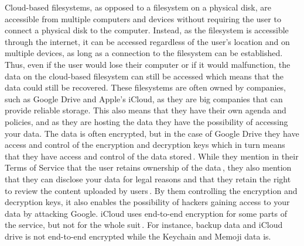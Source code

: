 Cloud-based filesystems, as opposed to a filesystem on a physical disk, are accessible from multiple computers and devices without requiring the user to connect a physical disk to the computer. Instead, as the filesystem is accessible through the internet, it can be accessed regardless of the user's location and on multiple devices, as long as a connection to the filesystem can be established. Thus, even if the user would lose their computer or if it would malfunction, the data on the cloud-based filesystem can still be accessed which means that the data could still be recovered. These filesystems are often owned by companies, such as Google Drive and Apple's iCloud, as they are big companies that can provide reliable storage. This also means that they have their own agenda and policies, and as they are hosting the data they have the possibility of accessing your data. The data is often encrypted, but in the case of Google Drive they have access and control of the encryption and decryption keys which in turn means that they have access and control of the data stored\,\cite{johnsonGoogleDriveSecure2021}. While they mention in their Terms of Service that the user retains ownership of the data\,\cite{googleGoogleDriveTerms}, they also mention that they can disclose your data for legal reasons and that they retain the right to review the content uploaded by users\,\cite{googleGoogleTermsService}. By them controlling the encryption and decryption keys, it also enables the possibility of hackers gaining access to your data by attacking Google. iCloud uses end-to-end encryption for some parts of the service, but not for the whole suit\,\cite{appleinc.ICloudSecurityOverview}. For instance, backup data and iCloud drive is not end-to-end encrypted while the Keychain and Memoji data is.

